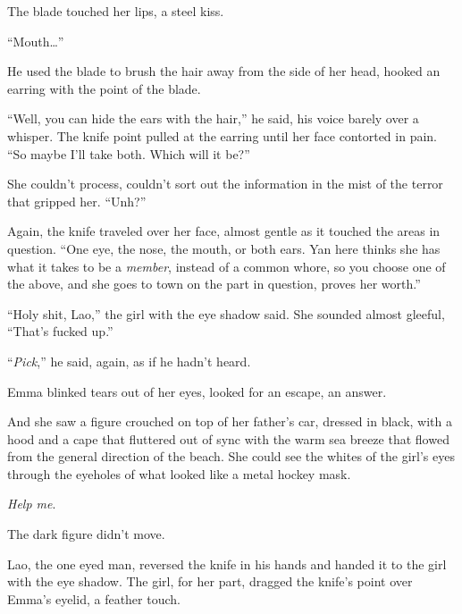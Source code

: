 The blade touched her lips, a steel kiss.



``Mouth\ldots''



He used the blade to brush the hair away from the side of her head, hooked an earring with the point of the blade.



``Well, you can hide the ears with the hair,'' he said, his voice barely over a whisper.  The knife point pulled at the earring until her face contorted in pain.  ``So maybe I'll take both.  Which will it be?''



She couldn't process, couldn't sort out the information in the mist of the terror that gripped her.  ``Unh?''



Again, the knife traveled over her face, almost gentle as it touched the areas in question.  ``One eye, the nose, the mouth, or both ears.  Yan here thinks she has what it takes to be a \emph{member}, instead of a common whore, so you choose one of the above, and she goes to town on the part in question, proves her worth.''



``Holy shit, Lao,'' the girl with the eye shadow said.  She sounded almost gleeful, ``That's fucked up.''



``\emph{Pick},'' he said, again, as if he hadn't heard.



Emma blinked tears out of her eyes, looked for an escape, an answer.



And she saw a figure crouched on top of her father's car, dressed in black, with a hood and a cape that fluttered out of sync with the warm sea breeze that flowed from the general direction of the beach.  She could see the whites of the girl's eyes through the eyeholes of what looked like a metal hockey mask.



\emph{Help me}.



The dark figure didn't move.



Lao, the one eyed man, reversed the knife in his hands and handed it to the girl with the eye shadow.  The girl, for her part, dragged the knife's point over Emma's eyelid, a feather touch.



